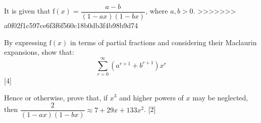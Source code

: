 \documentclass[12pt, a4 paper]{article}
\begin{document}
\begin{outline}[enumerate]
\1 It is given that $\textrm{f}(x)=\dfrac{a-b}{(1-ax)(1-bx)}$, where $a,b>0$. %
>>>>>>> a0f02f1c597ce6f3f6f560c18b0db3f4b98b9d74

\2 By expressing $\textrm{f}(x)$ in terms of partial fractions and considering their Maclaurin expansions, show that: $$\sum_{r=0}^{\infty}(a^{r+1}+b^{r+1})x^{r}$$\hfill[4]

\2 Hence or otherwise, prove that, if $x^3$ and higher powers of $x$ may be neglected, then $\dfrac{2}{(1-ax)(1-bx)} \approx 7+29x+133x^2$.
\hfill[2]
\end{outline}
\end{document}
